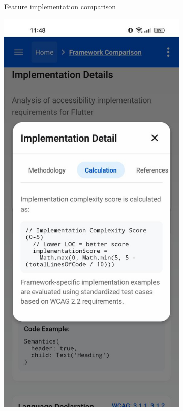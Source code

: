 \begin{figure}[ht]
\begin{subfigure}[b]{0.48\textwidth}
        \caption{Feature implementation comparison}
        \label{fig:implementation-feature-comparison}
    \end{subfigure}
    \hfill
    \begin{subfigure}[b]{0.48\textwidth}
        \centering
        \includegraphics[width=\linewidth, alt={Implementation Details tab showing code examples}]{img/implementation-calculation.jpg}

\end{subfigure}
\end{figure}
